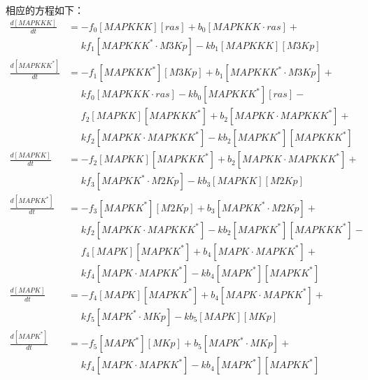 相应的方程如下：
\small
\begin{equation*}
  \begin{align*}
    \frac{d[MAPKKK]}{dt} &= -f_{0}[MAPKKK][ras] + b_{0}[MAPKKK\cdot{}ras] +\\
    &\phantom{=} kf_{1}[MAPKKK^{*}\cdot{}M3Kp] - kb_{1}[MAPKKK][M3Kp]\\
    \frac{d[MAPKKK^{*}]}{dt} &= -f_{1}[MAPKKK^{*}][M3Kp] + b_{1}[MAPKKK^{*}\cdot{}M3Kp] +\\
    &\phantom{=} kf_{0}[MAPKKK\cdot{}ras] - kb_{0}[MAPKKK^{*}][ras] -\\
    &\phantom{=} f_{2}[MAPKK][MAPKKK^{*}] + b_{2}[MAPKK\cdot{}MAPKKK^{*}] +\\
    &\phantom{=} kf_{2}[MAPKK\cdot{}MAPKKK^{*}] - kb_{2}[MAPKK^{*}][MAPKKK^{*}]\\
    \frac{d[MAPKK]}{dt} &= -f_{2}[MAPKK][MAPKKK^{*}] + b_{2}[MAPKK\cdot{}MAPKKK^{*}] +\\
    &\phantom{=} kf_{3}[MAPKK^{*}\cdot{}M2Kp] - kb_{3}[MAPKK][M2Kp]\\
    \frac{d[MAPKK^{*}]}{dt} &= -f_{3}[MAPKK^{*}][M2Kp] + b_{3}[MAPKK^{*}\cdot{}M2Kp] +\\
    &\phantom{=} kf_{2}[MAPKK\cdot{}MAPKKK^{*}] - kb_{2}[MAPKK^{*}][MAPKKK^{*}] -\\
    &\phantom{=} f_{4}[MAPK][MAPKK^{*}] + b_{4}[MAPK\cdot{}MAPKK^{*}] +\\
    &\phantom{=} kf_{4}[MAPK\cdot{}MAPKK^{*}] - kb_{4}[MAPK^{*}][MAPKK^{*}]\\
    \frac{d[MAPK]}{dt} &= -f_{4}[MAPK][MAPKK^{*}] + b_{4}[MAPK\cdot{}MAPKK^{*}] +\\
    &\phantom{=} kf_{5}[MAPK^{*}\cdot{}MKp] - kb_{5}[MAPK][MKp]\\ 
    \frac{d[MAPK^{*}]}{dt} &= -f_{5}[MAPK^{*}][MKp] + b_{5}[MAPK^{*}\cdot{}MKp] +\\
    &\phantom{=} kf_{4}[MAPK\cdot{}MAPKK^{*}] - kb_{4}[MAPK^{*}][MAPKK^{*}]\\
  \end{align*}
\end{equation*}
